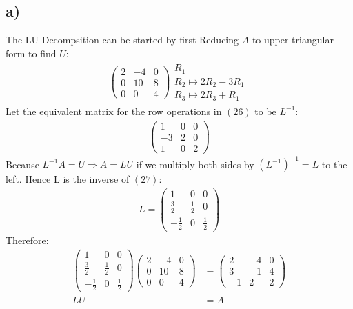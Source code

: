 \documentclass[11pt]{article}
\begin{document}
\subsection{a)}
The LU-Decompsition can be started by first Reducing $A$ to upper triangular form to find $U$:
\begin{align}
\left(\begin{array}{ccc}
2 & -4 & 0 \\
0 & 10 & 8 \\
0 & 0 & 4
\end{array}\right)
\begin{array}{l}
  \text{$R_1$}\\
  \text{$R_2 \longmapsto 2R_2 - 3R_1$}\\
  \text{$R_3 \longmapsto 2R_3 + R_1$ }
\end{array}
\end{align}
Let the equivalent matrix for the row operations in $(26)$ to be $L^{-1}$: 
\begin{align}
\left(\begin{array}{ccc}
1 & 0 & 0 \\
-3 & 2 & 0 \\
1 & 0 & 2
\end{array}\right)
\end{align}
Because $L^{-1}A=U \Rightarrow{} A=LU$ if we multiply both sides by $(L^{-1})^{-1}=L$ to the left.
Hence L is the inverse of $(27)$:
\begin{align}
L = \left(\begin{array}{ccc}
1 & 0 & 0 \\
\frac{3}{2} & \frac{1}{2} & 0 \\
-\frac{1}{2} & 0 & \frac{1}{2}
\end{array}\right)
\end{align}
Therefore:
\begin{align}
\left(\begin{array}{ccc}
1 & 0 & 0 \\
\frac{3}{2} & \frac{1}{2} & 0 \\
-\frac{1}{2} & 0 & \frac{1}{2}
\end{array}\right)
\left(\begin{array}{ccc}
2 & -4 & 0 \\
0 & 10 & 8 \\
0 & 0 & 4
\end{array}\right)
&=
\left(\begin{array}{ccc}
2 & -4 & 0 \\
3 & -1 & 4 \\
-1 & 2 & 2 
\end{array}\right) \\
LU &= A
\end{align}
\newpage
\end{document}
